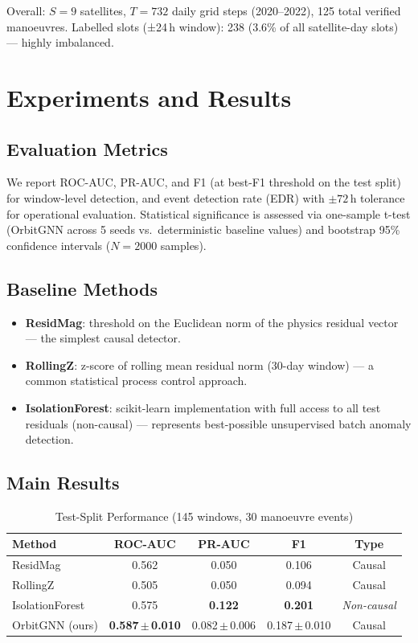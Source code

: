 \documentclass[conference]{IEEEtran}
\begin{document}
Overall: $S=9$ satellites, $T=732$ daily grid steps (2020--2022),
125 total verified manoeuvres. Labelled slots (±24\,h window):
238 (3.6\% of all satellite-day slots) — highly imbalanced.

\section{Experiments and Results}
\label{sec:results}

\subsection{Evaluation Metrics}

We report ROC-AUC, PR-AUC, and F1 (at best-F1 threshold on the test
split) for window-level detection, and event detection rate (EDR) with
$\pm72$\,h tolerance for operational evaluation. Statistical
significance is assessed via one-sample t-test (OrbitGNN across 5 seeds
vs.\ deterministic baseline values) and bootstrap 95\% confidence
intervals ($N=2000$ samples).

\subsection{Baseline Methods}

\begin{itemize}
  \item \textbf{ResidMag}: threshold on the Euclidean norm of the
        physics residual vector — the simplest causal detector.
  \item \textbf{RollingZ}: z-score of rolling mean residual norm
        (30-day window) — a common statistical process control approach.
  \item \textbf{IsolationForest}: scikit-learn implementation with
        full access to all test residuals (non-causal) — represents
        best-possible unsupervised batch anomaly detection.
\end{itemize}

\subsection{Main Results}

\begin{table}[h]
\centering
\caption{Test-Split Performance (145 windows, 30 manoeuvre events)}
\label{tab:main}
\begin{tabular}{@{}lcccc@{}}
\toprule
Method & ROC-AUC & PR-AUC & F1 & Type \\
\midrule
ResidMag        & 0.562 & 0.050 & 0.106 & Causal \\
RollingZ        & 0.505 & 0.050 & 0.094 & Causal \\
IsolationForest & 0.575 & \textbf{0.122} & \textbf{0.201} & \textit{Non-causal} \\
\midrule
OrbitGNN (ours) & \textbf{0.587\,$\pm$\,0.010} & 0.082\,$\pm$\,0.006 & 0.187\,$\pm$\,0.010 & Causal \\
\bottomrule
\end{tabular}
\end{table}
\end{document}
